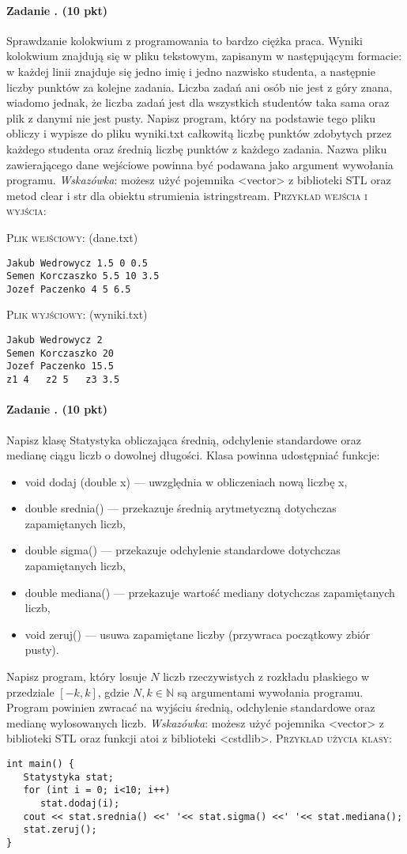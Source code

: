 \documentclass[12pt]{article}
\newcounter{zadanie}
\newcommand{\zadanie}{\stepcounter{zadanie}\paragraph*{Zadanie \arabic{zadanie}. (10 pkt)}}
\begin{document}
\zadanie
Sprawdzanie kolokwium z programowania to bardzo ciężka praca. Wyniki kolokwium znajdują się w pliku tekstowym, zapisanym w następującym formacie: w każdej linii znajduje się jedno imię i jedno nazwisko studenta, a następnie liczby punktów za kolejne zadania. Liczba zadań ani osób nie jest z góry znana, wiadomo jednak, że liczba zadań jest dla wszystkich studentów taka sama oraz plik z danymi nie jest pusty. Napisz program, który na podstawie tego pliku obliczy i wypisze do pliku \textsf{wyniki.txt} całkowitą liczbę punktów zdobytych przez każdego studenta oraz średnią liczbę punktów z każdego zadania. Nazwa pliku zawierającego dane wejściowe powinna być podawana jako argument wywołania programu. \textit{Wskazówka}: możesz użyć pojemnika \textsf{<vector>} z biblioteki STL oraz metod \textsf{clear} i \textsf{str} dla obiektu strumienia \textsf{istringstream}. \textsc{Przykład wejścia i wyjścia:} 
\begin{multicols}{2}
\textsc{Plik wejściowy:} (\textsf{dane.txt})
\begin{verbatim}
Jakub Wedrowycz 1.5 0 0.5
Semen Korczaszko 5.5 10 3.5
Jozef Paczenko 4 5 6.5

\end{verbatim}
\textsc{Plik wyjściowy:} (\textsf{wyniki.txt})
\begin{verbatim}
Jakub Wedrowycz 2
Semen Korczaszko 20
Jozef Paczenko 15.5
z1 4   z2 5   z3 3.5
\end{verbatim}
\end{multicols}

\zadanie
Napisz klasę \textsf{Statystyka} obliczająca średnią, odchylenie standardowe oraz medianę ciągu liczb o dowolnej długości. Klasa powinna udostępniać
funkcje:
\begin{itemize}
\item \textsf{void dodaj (double x)} — uwzględnia w obliczeniach nową liczbę \textsf{x},
\item \textsf{double srednia()} — przekazuje średnią arytmetyczną dotychczas zapamiętanych liczb,
\item \textsf{double sigma()} — przekazuje odchylenie standardowe dotychczas zapamiętanych liczb,
\item \textsf{double mediana()} — przekazuje wartość mediany dotychczas zapamiętanych liczb,
\item \textsf{void zeruj()} — usuwa zapamiętane liczby (przywraca początkowy zbiór pusty).
\end{itemize}

Napisz program, który losuje $N$ liczb rzeczywistych z rozkładu płaskiego w przedziale $[-k,k]$, gdzie $N,k\in\mathbb{N}$ są argumentami wywołania programu. Program powinien zwracać na wyjściu średnią, odchylenie standardowe oraz medianę wylosowanych liczb. \textit{Wskazówka}: możesz użyć pojemnika \textsf{<vector>} z biblioteki STL oraz funkcji \textsf{atoi} z biblioteki \textsf{<cstdlib>}. \textsc{Przykład użycia klasy:}
\begin{verbatim}
int main() {
   Statystyka stat;
   for (int i = 0; i<10; i++)
      stat.dodaj(i);
   cout << stat.srednia() <<' '<< stat.sigma() <<' '<< stat.mediana();
   stat.zeruj();
}
\end{verbatim}
\end{document}

